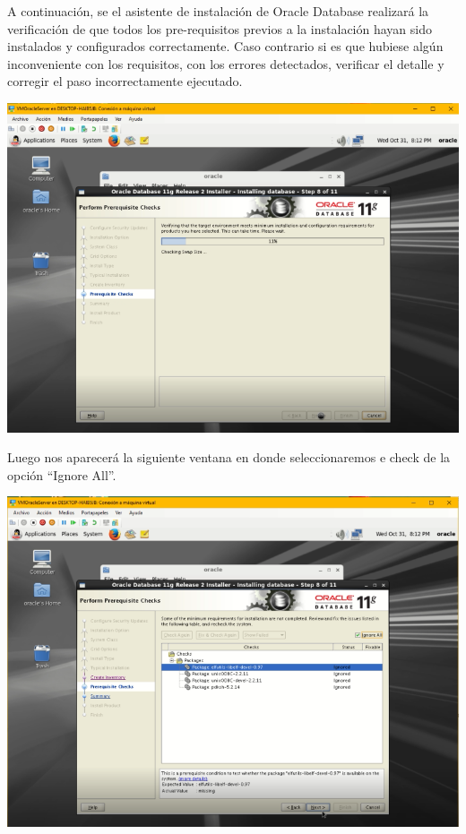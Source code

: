 \vspace{\baselineskip}

A continuación, se el asistente de instalación de Oracle Database realizará la verificación de que todos los pre-requisitos previos a la instalación hayan sido instalados y configurados correctamente. 
Caso contrario si es que hubiese algún inconveniente con los requisitos, con los errores detectados, verificar el detalle y corregir el paso incorrectamente ejecutado.
\begin{center}
	\includegraphics[width=15cm]{./Imagenes/79} 
\end{center}

\vspace{\baselineskip}

Luego nos aparecerá la siguiente ventana en donde seleccionaremos e check de la opción “Ignore All”.
\begin{center}
	\includegraphics[width=15cm]{./Imagenes/80} 
\end{center}

